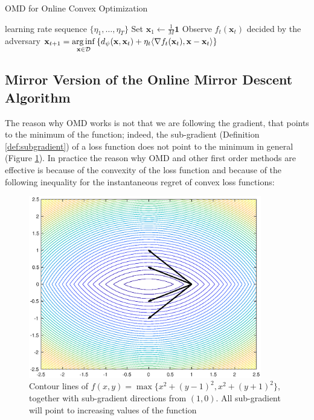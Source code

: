 \begin{algorithm}[t!]
    \caption{OMD for Online Convex Optimization} 
    \label{alg:OMD_in_OCO}
    \begin{algorithmic}[1]
    \REQUIRE learning rate sequence $\{\eta_1, \ldots, \eta_T\}$  \nonumber
    \STATE Set $\mathbf{\mathbf x}_1 \gets \frac{1}{M} \mathbf{1}$ \label{line:init}
    \STATE Observe $f_t(\mathbf x_t)$ decided by the adversary \label{line:out}
    \STATE $\mathbf x_{t+1} =\operatorname*{arg\,inf}\limits_{\mathbf x\in\mathcal D}\left\{ d_\psi(\mathbf x,\mathbf x_t)+\eta_t\langle\nabla f_t(\mathbf x_t),\mathbf x-\mathbf x_t\rangle\right\}$\label{line:update}
    \ENDFOR
    \end{algorithmic}
\end{algorithm}

\subsection{Mirror Version of the Online Mirror Descent Algorithm} 

The reason why OMD works is not that we are following the gradient, that points to the minimum of the function; indeed, the sub-gradient (Definition \ref{def:subgradient}) of a loss function does not point to the minimum in general (Figure \ref{fig_no_grad}). In practice the reason why OMD and other first order methods are effective is because of the convexity of the loss function and because of the following inequality for the instantaneous regret of convex loss functions:

\begin{figure}[!ht]
\begin{center}
\includegraphics[width=4in,keepaspectratio]{./img/no_grad.eps}
\caption{Contour lines of $f(x,y)=\max\{x^2+(y-1)^2,x^2+(y+1)^2\}$, together with sub-gradient directions from $(1,0)$. All sub-gradient will point to increasing values of the function}
\label{fig_no_grad}
\end{center}
\end{figure}

